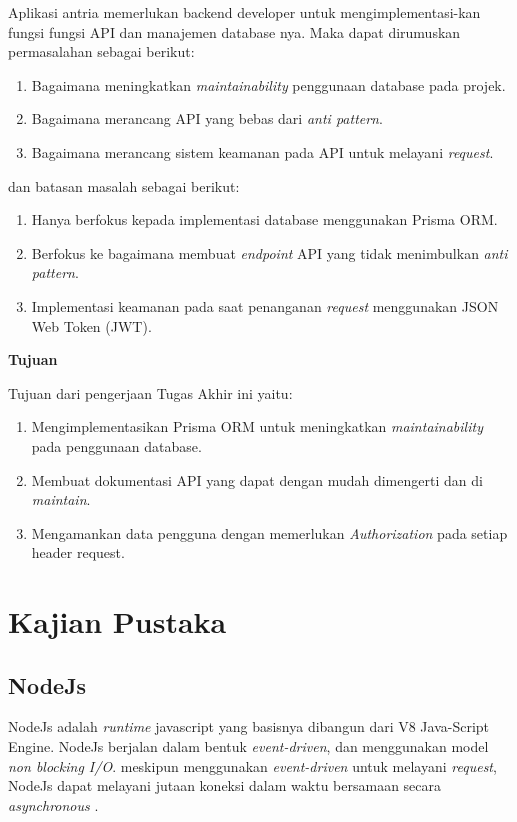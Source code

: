 Aplikasi antria memerlukan backend developer untuk mengimplementasi-kan fungsi fungsi API dan manajemen database nya. Maka dapat dirumuskan permasalahan sebagai berikut:
\begin{enumerate}
  \item Bagaimana meningkatkan \textit{maintainability} penggunaan database pada projek.
  \item Bagaimana merancang API yang bebas dari \textit{anti pattern}.
  \item Bagaimana merancang sistem keamanan pada API untuk melayani \textit{request}.
\end{enumerate}
dan batasan masalah sebagai berikut:
\begin{enumerate}
  \item Hanya berfokus kepada implementasi database menggunakan Prisma ORM.
  \item Berfokus ke bagaimana membuat \textit{endpoint} API yang tidak menimbulkan \textit{anti pattern}.
  \item Implementasi keamanan pada saat penanganan \textit{request} menggunakan JSON Web Token (JWT).
\end{enumerate}


\noindent\textbf{Tujuan}

Tujuan dari pengerjaan Tugas Akhir ini yaitu:
\begin{enumerate}
  \item Mengimplementasikan Prisma ORM untuk meningkatkan \textit{maintainability} pada penggunaan database.
  \item Membuat dokumentasi API yang dapat dengan mudah dimengerti dan di \textit{maintain}.
  \item Mengamankan data pengguna dengan memerlukan \textit{Authorization} pada setiap header request.
  
\end{enumerate}



\section{Kajian Pustaka}
\subsection{NodeJs}
NodeJs adalah \textit{runtime} javascript yang basisnya dibangun dari V8 Java-Script Engine. NodeJs berjalan dalam bentuk \textit{event-driven}, dan menggunakan model \textit{non blocking I/O}. meskipun menggunakan \textit{event-driven} untuk melayani \textit{request}, NodeJs dapat melayani jutaan koneksi dalam waktu bersamaan secara \textit{asynchronous} \cite{shah2017node}.

